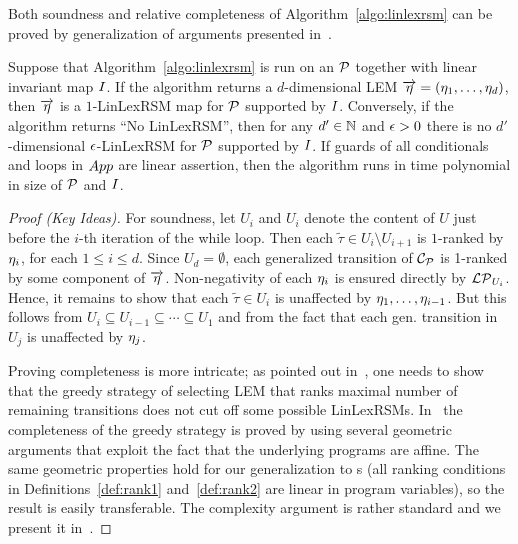 Both soundness and relative completeness of Algorithm~\ref{algo:linlexrsm} 
can be proved by generalization of arguments presented 
in~\cite{ADFG10:lexicographic}. 
\begin{theorem}
\label{thm:algo}
\label{THM:ALGO}
	Suppose that Algorithm~\ref{algo:linlexrsm} is run on an \APP{} $\mathcal{P}$ 
	together with linear invariant map $I$. If the algorithm returns a 
	$d$-dimensional LEM $\overrightarrow{\eta}=(\eta_1,\dots,\eta_d)$, then 
	$\overrightarrow{\eta}$ 
	is a $1$-LinLexRSM map for $\mathcal{P}$ supported by $I$. Conversely, if 
	the algorithm returns ``No LinLexRSM'', then for any $d'\in \mathbb{N}$ and 
	$\epsilon>0$ there is no $d'$-dimensional $\epsilon$-LinLexRSM for $\mathcal{P}$  
	supported by $I$. If guards of all conditionals and loops in ${\sc App}{}$ 
	are linear assertion, then the
	algorithm runs in time polynomial in size of 
	$\mathcal{P}$ and $I$.
\end{theorem}
\begin{proof}[Proof (Key Ideas)]
For soundness, let $U_i$ and $U_{i}$ denote the content of $U$ just before the 
$i$-th iteration of the while loop. Then each $\tilde{\tau}\in U_{i}\setminus 
U_{i+1}$ is $1$-ranked by $\eta_i$, for each $1\leq i \leq d$. Since 
$U_{d}=\emptyset$, each generalized transition of $\mathcal{C}_{\mathcal{P}}$ is 
1-ranked by some component of $\overrightarrow{\eta}$. Non-negativity of each 
$\eta_i$ is ensured directly by $\mathcal{LP}_{U_i}$. Hence, it remains to show that 
each $\tilde{\tau}\in U_i$ is unaffected by $\eta_1,\dots,\eta_{i-1}$. But this 
follows from $U_i \subseteq U_{i-1}\subseteq \cdots\subseteq U_1$ and from the 
fact that each gen. transition in $U_j$ is unaffected by $\eta_j$.

Proving completeness is more intricate; as pointed out 
in~\cite{ADFG10:lexicographic}, one needs to show that the greedy strategy of 
selecting LEM that ranks maximal number of remaining transitions does not cut 
off some possible LinLexRSMs. In~\cite{ADFG10:lexicographic} the completeness 
of the greedy strategy is proved by using several geometric arguments that 
exploit the fact that the underlying programs are affine. The same geometric 
properties hold for our generalization to \APP{}s (all ranking conditions in 
Definitions~\ref{def:rank1} and~\ref{def:rank2} are linear in program 
variables), so the result is easily transferable. The complexity argument is 
rather standard and we present it in~\AppendixMaterial.
\end{proof}


